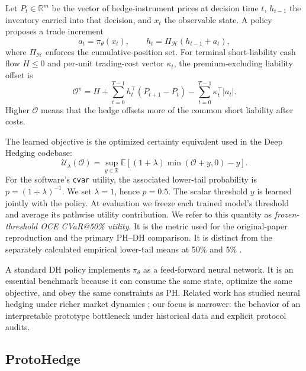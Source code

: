 \documentclass[conference]{IEEEtran}
\newcommand{\Offset}{\mathcal{O}}
\begin{document}
Let $P_t\in\mathbb{R}^{m}$ be the vector of hedge-instrument prices at decision
time $t$, $h_{t-1}$ the inventory carried into that decision, and $x_t$ the
observable state. A policy proposes a trade increment
\begin{equation}
    a_t=\pi_\theta(x_t), \qquad
    h_t=\Pi_{\mathcal H}(h_{t-1}+a_t),
    \label{eq:policy}
\end{equation}
where $\Pi_{\mathcal H}$ enforces the cumulative-position set. For terminal
short-liability cash flow $H\leq0$ and per-unit trading-cost vector $\kappa_t$,
the premium-excluding liability offset is
\begin{equation}
\Offset^\pi
=H+\sum_{t=0}^{T-1}h_t^\top(P_{t+1}-P_t)
-\sum_{t=0}^{T-1}\kappa_t^\top|a_t|.
\label{eq:offset}
\end{equation}
Higher $\Offset$ means that the hedge offsets more of the common short
liability after costs.

The learned objective is the optimized certainty equivalent used in the Deep
Hedging codebase:
\begin{equation}
\mathcal U_\lambda(\Offset)
=\sup_{y\in\mathbb R}\mathbb E\left[(1+\lambda)
\min(\Offset+y,0)-y\right].
\label{eq:oce}
\end{equation}
For the software's \texttt{cvar} utility, the associated lower-tail probability
is $p=(1+\lambda)^{-1}$. We set $\lambda=1$, hence $p=0.5$. The scalar threshold
$y$ is learned jointly with the policy. At evaluation we freeze each trained
model's threshold and average its pathwise utility contribution. We refer to
this quantity as \emph{frozen-threshold OCE CVaR@50\% utility}. It is the metric
used for the original-paper reproduction and the primary PH--DH comparison.
It is distinct from the separately calculated empirical lower-tail means at
50\% and 5\% \cite{rockafellar2000}.

A standard DH policy implements $\pi_\theta$ as a feed-forward neural network.
It is an essential benchmark because it can consume the same state, optimize
the same objective, and obey the same constraints as PH. Related work has
studied neural hedging under richer market dynamics \cite{gao2023deeper}; our
focus is narrower: the behavior of an interpretable prototype bottleneck under
historical data and explicit protocol audits.

\subsection{ProtoHedge}
\end{document}
